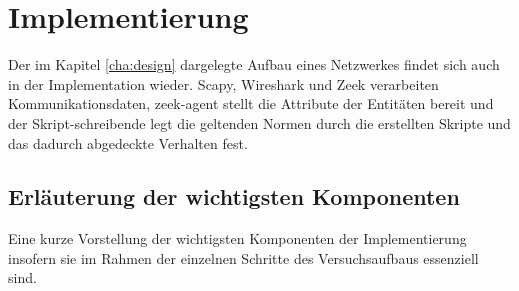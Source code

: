\chapter{Implementierung}%
\label{cha:implementation}





Der im Kapitel \ref{cha:design} dargelegte Aufbau eines Netzwerkes findet sich auch in der Implementation wieder. Scapy, Wireshark und Zeek verarbeiten Kommunikationsdaten, zeek-agent stellt die Attribute der Entitäten bereit und der Skript-schreibende legt die geltenden Normen durch die erstellten Skripte und das dadurch abgedeckte Verhalten fest.
\section{Erläuterung der wichtigsten Komponenten}
Eine kurze Vorstellung der wichtigsten Komponenten der Implementierung insofern sie im Rahmen der einzelnen Schritte des Versuchsaufbaus essenziell sind.
